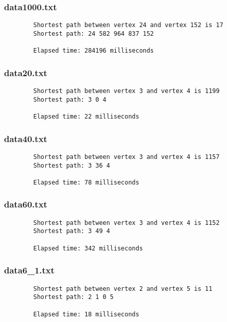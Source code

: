 \documentclass{article}
\begin{document}
    \subsubsection*{data1000.txt}
    \begin{verbatim}
        Shortest path between vertex 24 and vertex 152 is 17
        Shortest path: 24 582 964 837 152

        Elapsed time: 284196 milliseconds
    \end{verbatim}

    \subsubsection*{data20.txt}
    \begin{verbatim}
        Shortest path between vertex 3 and vertex 4 is 1199
        Shortest path: 3 0 4

        Elapsed time: 22 milliseconds
    \end{verbatim}

    \subsubsection*{data40.txt}
    \begin{verbatim}
        Shortest path between vertex 3 and vertex 4 is 1157
        Shortest path: 3 36 4

        Elapsed time: 78 milliseconds
    \end{verbatim}

    \subsubsection*{data60.txt}
    \begin{verbatim}
        Shortest path between vertex 3 and vertex 4 is 1152
        Shortest path: 3 49 4

        Elapsed time: 342 milliseconds
    \end{verbatim}

    \subsubsection*{data6_1.txt}
    \begin{verbatim}
        Shortest path between vertex 2 and vertex 5 is 11
        Shortest path: 2 1 0 5

        Elapsed time: 18 milliseconds
    \end{verbatim}
\end{document}
